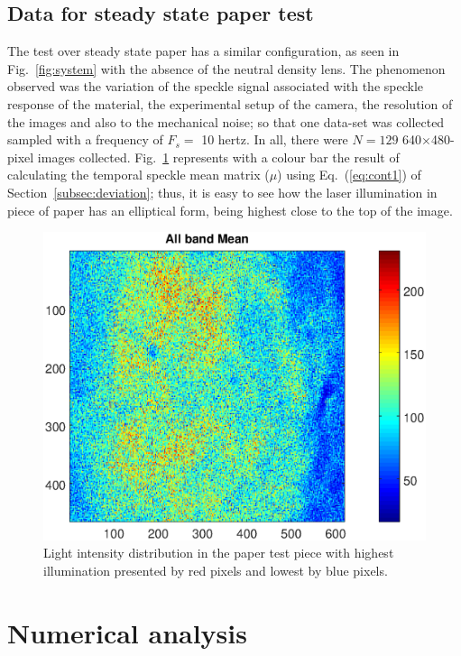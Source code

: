 \documentclass[review]{elsarticle}
\begin{document}
\subsection{Data for steady state paper test}
\label{sec:descriptionpaper}
The test over steady state paper has a similar configuration, as seen in
Fig.~\ref{fig:system} with the absence of 
the neutral density lens.
The phenomenon observed was the variation of the speckle signal associated with  the speckle response of the material, 
the experimental setup of the camera, the resolution of the images and also to the mechanical noise; 
so that one data-set was collected sampled with a frequency of $F_s=$ 10 hertz. 
In all, there were $N=129$ 640$\times$480-pixel images collected.
Fig.~\ref{fig:meanpaper} represents
with a colour bar the result of calculating the temporal speckle mean matrix ($\mu$) using Eq.~(\ref{eq:cont1})
of Section~\ref{subsec:deviation}; thus, it is easy to see how the
laser illumination in piece of paper
has an elliptical form, being highest 
close to the top of the image.
\begin{figure}[h!]
\centering
\includegraphics[width=0.85\columnwidth]{meanall.eps}
\caption{Light intensity distribution in the paper test piece with highest illumination 
presented by red pixels and lowest by blue pixels.}
\label{fig:meanpaper}
\end{figure}

\section{Numerical analysis}
\label{sec:analysis}
\end{document}
